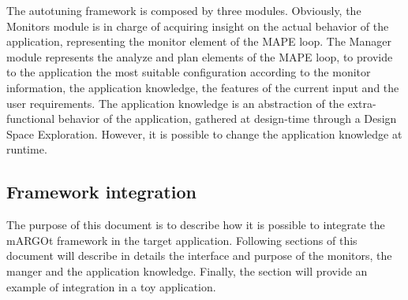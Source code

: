 The autotuning framework is composed by three modules. 
Obviously, the Monitors module is in charge of acquiring insight on the actual behavior of the application, representing the monitor element of the MAPE loop.
The Manager module represents the analyze and plan elements of the MAPE loop, to provide to the application the most suitable configuration according to the monitor information, the application knowledge, the features of the current input and the user requirements.
The application knowledge is an abstraction of the extra-functional behavior of the application, gathered at design-time through a Design Space Exploration.
However, it is possible to change the application knowledge at runtime.


\subsection{Framework integration}

The purpose of this document is to describe how it is possible to integrate the mARGOt framework in the target application.
Following sections of this document will describe in details the interface and purpose of the monitors, the manger and the application knowledge.
Finally, the  section will provide an example of integration in a toy application.





